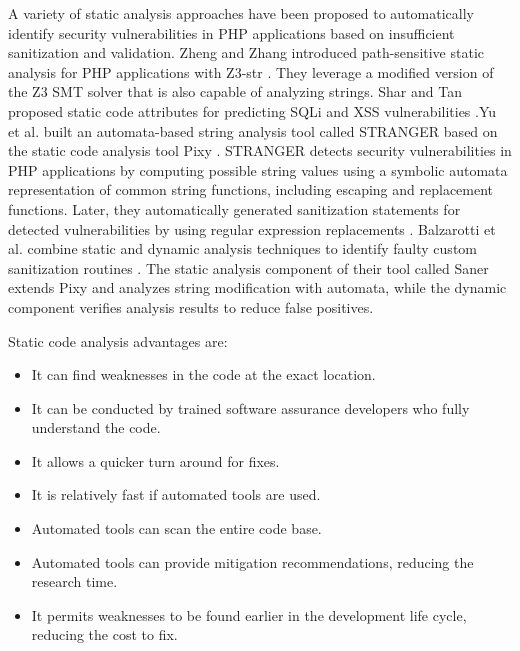 A variety of static analysis approaches have been proposed
to automatically identify security vulnerabilities in PHP applications
based on insufficient sanitization and validation.
Zheng and Zhang introduced path-sensitive static analysis
for PHP applications with Z3-str \cite{ref_94_zheng2013path}. They leverage a
modified version of the Z3 SMT solver that is also capable
of analyzing strings. Shar and Tan proposed static code attributes
for predicting SQLi and XSS vulnerabilities \cite{ref_97_shar2012predicting, ref_98_shar2013mining}.Yu et al. built an automata-based string analysis tool
called STRANGER \cite{ref_95_yu2010stranger} based on the static code analysis
tool Pixy \cite{ref_99_jovanovic2006pixy}. STRANGER detects security vulnerabilities
in PHP applications by computing possible string
values using a symbolic automata representation of common
string functions, including escaping and replacement
functions. Later, they automatically generated sanitization
statements for detected vulnerabilities by using regular expression
replacements \cite{ref_96_yu2011patching}. Balzarotti et al. combine static
and dynamic analysis techniques to identify faulty custom
sanitization routines \cite{ref_62_balzarotti2008saner}. The static analysis component of
their tool called Saner extends Pixy and analyzes string
modification with automata, while the dynamic component
verifies analysis results to reduce false positives.

Static code analysis advantages are:
\begin{itemize}
	\item It can find weaknesses in the code at the exact location.
	\item It can be conducted by trained software assurance developers who fully understand the code.
	\item It allows a quicker turn around for fixes.
	\item It is relatively fast if automated tools are used.
	\item Automated tools can scan the entire code base.
	\item Automated tools can provide mitigation recommendations, reducing the research time.
	\item It permits weaknesses to be found earlier in the development life cycle, reducing the cost to fix.
\end{itemize}

